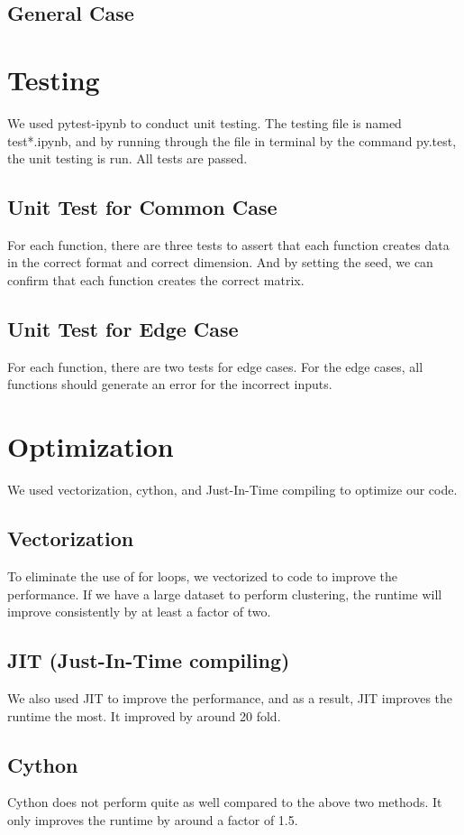 \documentclass[11pt]{article}
\begin{document}
\subsection{General Case}


\section{Testing}
We used pytest-ipynb to conduct unit testing. The testing file is named test*.ipynb, and by running through the file in terminal by the command py.test, the unit testing is run. All tests are passed. 
\subsection{Unit  Test for Common Case}
For each function, there are three tests to assert that each function creates data in the correct format and correct dimension. And by setting the seed, we can confirm that each function creates the correct matrix.
\subsection{Unit Test for Edge Case}
For each function, there are two tests for edge cases. For the edge cases, all functions should generate an error for the incorrect inputs. 

\section{Optimization}
We used vectorization, cython, and Just-In-Time compiling to optimize our code.
\subsection{Vectorization}
To eliminate the use of for loops, we vectorized to code to improve the performance. If we have a large dataset to perform clustering, the runtime will improve consistently by at least a factor of two.
\subsection{JIT (Just-In-Time compiling) }
We also used JIT to improve the performance, and as a result, JIT improves the runtime the most. It improved by around 20 fold.
\subsection{Cython}
Cython does not perform quite as well compared to the above two methods. It only improves the runtime by around a factor of 1.5.
\end{document}
